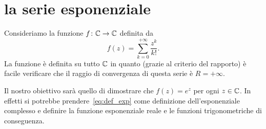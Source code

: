 \section{la serie esponenziale}

Consideriamo la funzione $f \colon {\mathbb C} \to {\mathbb C}$
definita da 
\begin{equation}\label{eq:def_exp}
f(z) = \sum_{k=0}^{+\infty} \frac{z^k}{k!}.
\end{equation}
La funzione è definita su tutto ${\mathbb C}$ in quanto (grazie al criterio del rapporto)
è facile verificare che il raggio di convergenza di questa serie è $R=+\infty$.

Il nostro obiettivo sarà quello di dimostrare che $f(z)=e^z$ per ogni $z\in {\mathbb C}$.
In effetti si potrebbe prendere~\ref{eq:def_exp} come definizione 
dell'esponenziale complesso e definire la funzione esponenziale 
reale e le funzioni trigonometriche di conseguenza.

